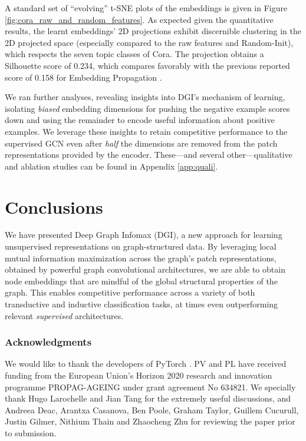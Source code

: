 \documentclass{article} \usepackage{iclr2019_conference,times}
\begin{document}
A standard set of ``evolving'' t-SNE plots \citep{maaten2008visualizing} of the embeddings is given in Figure \ref{fig:cora_raw_and_random_features}. As expected given the quantitative results, the learnt embeddings' 2D projections exhibit discernible clustering in the 2D projected space (especially compared to the raw features and Random-Init), which respects the seven topic classes of Cora. The projection obtains a Silhouette score \citep{rousseeuw1987silhouettes} of 0.234, which compares favorably with the previous reported score of 0.158 for Embedding Propagation \citep{duran2017learning}.

We ran further analyses, revealing insights into DGI's mechanism of learning, isolating \emph{biased} embedding dimensions for pushing the negative example scores down and using the remainder to encode useful information about positive examples. We leverage these insights to retain competitive performance to the supervised GCN even after \emph{half} the dimensions are removed from the patch representations provided by the encoder. These---and several other---qualitative and ablation studies can be found in Appendix \ref{app:quali}.











\section{Conclusions}

We have presented Deep Graph Infomax (DGI), a new approach for learning unsupervised representations on graph-structured data. By leveraging local mutual information maximization across the graph's patch representations, obtained by powerful graph convolutional architectures, we are able to obtain node embeddings that are mindful of the global structural properties of the graph. This enables competitive performance across a variety of both transductive and inductive classification tasks, at times even outperforming relevant \emph{supervised} architectures.

\newpage
\subsubsection*{Acknowledgments}
We would like to thank the developers of PyTorch \citep{paszke2017automatic}. PV and PL have received funding from the European Union's Horizon 2020 research and innovation programme PROPAG-AGEING under grant agreement No 634821. We specially thank Hugo Larochelle and Jian Tang for the extremely useful discussions, and Andreea Deac, Arantxa Casanova, Ben Poole, Graham Taylor, Guillem Cucurull, Justin Gilmer, Nithium Thain and Zhaocheng Zhu for reviewing the paper prior to submission.
\end{document}
